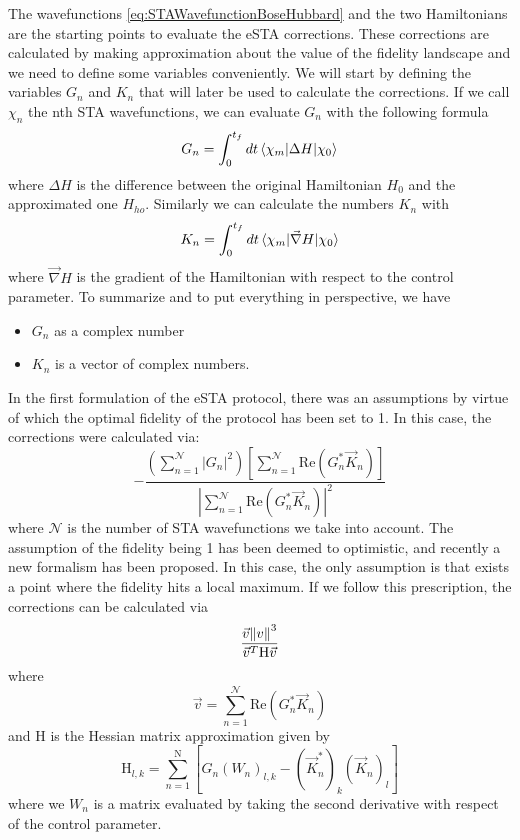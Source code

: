 The wavefunctions \cref{eq:STAWavefunctionBoseHubbard} and the two Hamiltonians are the starting points to evaluate the eSTA corrections.
These corrections are calculated by making approximation about the value of the fidelity landscape and we need to define some variables conveniently.
We will start by defining the variables $G_n$ and $ K_{n} $ that will later be used to calculate the corrections.
If we call $ \chi_{n} $ the nth STA wavefunctions, we can evaluate $ G_n $ with the following formula
\begin{equation}
	G_{n} = \int_{0}^{t_{f}} dt \braket{\chi_{m}|\Delta H |\chi_{0}}
	\label{eq:Gn}
\end{equation}
where $ \Delta H $ is the difference between the original Hamiltonian $ H_{0} $ and the approximated one $ H_{ho} $.
Similarly we can calculate the numbers $ K_{n} $ with
\begin{equation}
	K_{n} = \int_{0}^{t_{f}} dt \braket{\chi_{m}|\vec{\nabla} H|\chi_{0}}
	\label{eq:Kn}
\end{equation}
where $ \vec{\nabla} H$ is the gradient of the Hamiltonian with respect to the control parameter.
To summarize and to put everything in perspective, we have
\begin{itemize}
	\item  $ G_{n} $ as a complex number
	\item  $ K_{n} $ is a vector of complex numbers.
\end{itemize}
In the first formulation of the eSTA protocol, there was an assumptions by virtue of which the optimal fidelity of the protocol has been set to 1.
In this case, the corrections were calculated via:
\begin{equation}
	\label{eq:eSTAcorrections}
	-\frac
	{
	\left( \sum_{n=1}^{\mathcal{N}} |G_{n}|^2 \right)
	\left[ \sum_{n=1}^{\mathcal{N}}\text{Re}(G_{n}^{*}\vec{K}_{n})\right]
	}
	{\left|\sum_{n=1}^{\mathcal{N}}\text{Re}(G_{n}^{*}\vec{K}_{n})\right|^2 }
\end{equation}
where $ \mathcal{N} $ is the number of STA wavefunctions we take into account.
The assumption of the fidelity being 1 has been deemed to optimistic, and recently a new formalism has been proposed.
In this case, the only assumption is that exists a point where the fidelity hits a local maximum.
If we follow this prescription, the corrections can be calculated via
\begin{equation}
	\frac
	{\vec{v}\norm{v}^{3}}
	{\vec{v}^{T}\mathrm{H}\vec{v}}
	\label{eq:eSTAcorrectionsHessian}
\end{equation}
where
\begin{equation}
	\vec{v} = \sum_{n=1}^{\mathcal{N}}\text{Re}(G_{n}^{*}\vec{K}_{n})
	\label{eq:FidelityVector}
\end{equation}
and $ \mathrm{H} $ is the Hessian matrix approximation given by
\begin{equation}
	\mathrm{H}_{l,k} = \sum_{n = 1}^{\mathrm{N}}\left[G_{n}(W_{n})_{l,k} - \left(  \vec{K}^{*}_{n} \right)_{k}\left(  \vec{K}_{n} \right)_{l}\right]
	\label{eq:HessianMatrix}
\end{equation}
where we $ W_{n} $ is a matrix evaluated by taking the second derivative with respect of the control parameter.
